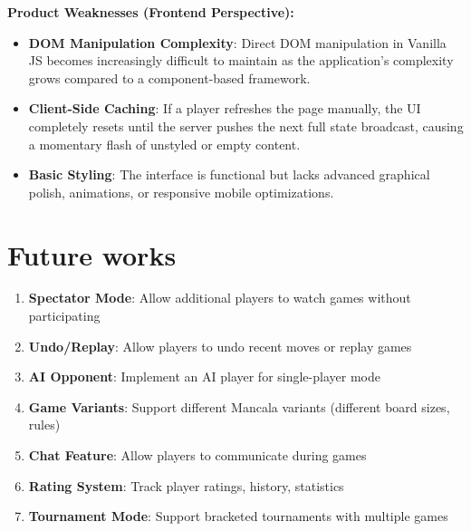\documentclass{scrartcl}
\begin{document}
\textbf{Product Weaknesses (Frontend Perspective):}
\begin{itemize}
  \item \textbf{DOM Manipulation Complexity}: Direct DOM manipulation in Vanilla JS becomes increasingly difficult to maintain as the application's complexity grows compared to a component-based framework.
  \item \textbf{Client-Side Caching}: If a player refreshes the page manually, the UI completely resets until the server pushes the next full state broadcast, causing a momentary flash of unstyled or empty content.
  \item \textbf{Basic Styling}: The interface is functional but lacks advanced graphical polish, animations, or responsive mobile optimizations.
\end{itemize}



\section{Future works}\label{future-works}


\begin{enumerate}
  \item \textbf{Spectator Mode}: Allow additional players to watch games without participating

  \item \textbf{Undo/Replay}: Allow players to undo recent moves or replay games

  \item \textbf{AI Opponent}: Implement an AI player for single-player mode

  \item \textbf{Game Variants}: Support different Mancala variants (different board sizes, rules)

  \item \textbf{Chat Feature}: Allow players to communicate during games

  \item \textbf{Rating System}: Track player ratings, history, statistics

  \item \textbf{Tournament Mode}: Support bracketed tournaments with multiple games
\end{enumerate}
\end{document}
